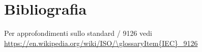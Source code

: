 \section{Bibliografia}
  \begin{thebibliography}{56}
     Per approfondimenti sullo standard / 9126 vedi \\
    \url{https://en.wikipedia.org/wiki/ISO/\glossaryItem{IEC}_9126}
  \end{thebibliography}
